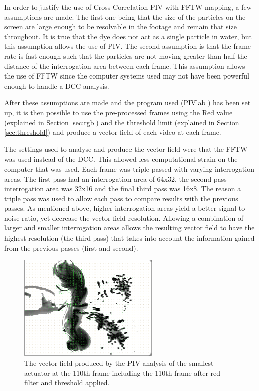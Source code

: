 In order to justify the use of Cross-Correlation PIV with FFTW mapping, a few assumptions are made. The first one being that the size of the particles on the screen are large enough to be resolvable in the footage and remain that size throughout. It is true that the dye does not act as a single particle in water, but this assumption allows the use of PIV. The second assumption is that the frame rate is fast enough such that the particles are not moving greater than half the distance of the interrogation area between each frame. This assumption allows the use of FFTW since the computer systems used may not have been powerful enough to handle a DCC analysis.

After these assumptions are made and the program used (PIVlab \cite{pivlab}) has been set up, it is then possible to use the pre-processed frames using the Red value (explained in Section \ref{sec:rgb}) and the threshold limit (explained in Section \ref{sec:threshold}) and produce a vector field of each video at each frame.

The settings used to analyse and produce the vector field were that the FFTW was used instead of the DCC. This allowed less computational strain on the computer that was used. Each frame was triple passed with varying interrogation areas. The first pass had an interrogation area of 64x32, the second pass interrogation area was 32x16 and the final third pass was 16x8. The reason a triple pass was used to allow each pass to compare results with the previous passes. As mentioned above, higher interrogation areas yield a better signal to noise ratio, yet decrease the vector field resolution. Allowing a combination of larger and smaller interrogation areas allows the resulting vector field to have the highest resolution (the third pass) that takes into account the information gained from the previous passes (first and second).

\begin{figure}[H]
\centering
\includegraphics[width=0.6\textwidth]{Pictures/PIVlab_out_small_110_110.jpg}
     \caption{The vector field produced by the PIV analysis of the smallest actuator at the 110th frame including the 110th frame after red filter and threshold applied.}
     \label{fig:PIVfield}
\end{figure}


